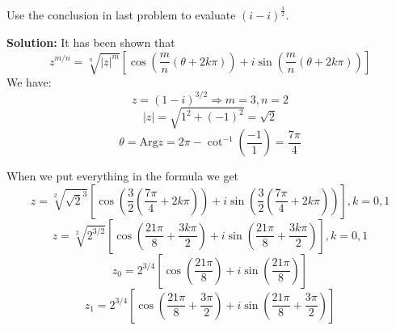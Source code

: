 \begin{exercise}
    Use the conclusion in last problem to evaluate $(i-i)^\frac{3}{2}$.
\end{exercise}
\textbf{Solution:}
It has been shown that
\begin{equation}
    \boxed{ z^{m/n} = \sqrt[n]{|z|^m}\left[\cos\left(\frac{m}{n}(\theta + 2k\pi)\right) + i\sin\left(\frac{m}{n}(\theta + 2k\pi)\right)\right]}
\end{equation}
We have:
\[ z = (1 - i)^{3/2} \Rightarrow m = 3, n = 2 \]
\[ |z| = \sqrt{1^2 + (-1)^2} = \sqrt{2} \]
\[ \theta = \text{Arg} z = 2\pi - \cot^{-1}\left(\frac{-1}{1}\right) = \frac{7\pi}{4} \]

When we put everything in the formula we get
\[ z = \sqrt[2]{\sqrt{2}^3}\left[\cos\left(\frac{3}{2}\left(\frac{7\pi}{4} + 2k\pi\right)\right) + i\sin\left(\frac{3}{2}\left(\frac{7\pi}{4} + 2k\pi\right)\right)\right], k = 0, 1 \]
\[ z = \sqrt[2]{2^{3/2}}\left[\cos\left(\frac{21\pi}{8} + \frac{3k\pi}{2}\right) + i\sin\left(\frac{21\pi}{8} + \frac{3k\pi}{2}\right)\right], k = 0, 1 \]
\[ z_0 = 2^{3/4}\left[\cos\left(\frac{21\pi}{8}\right) + i\sin\left(\frac{21\pi}{8}\right)\right] \]
\[ z_1 = 2^{3/4}\left[\cos\left(\frac{21\pi}{8} + \frac{3\pi}{2}\right) + i\sin\left(\frac{21\pi}{8} + \frac{3\pi}{2}\right)\right] \]


